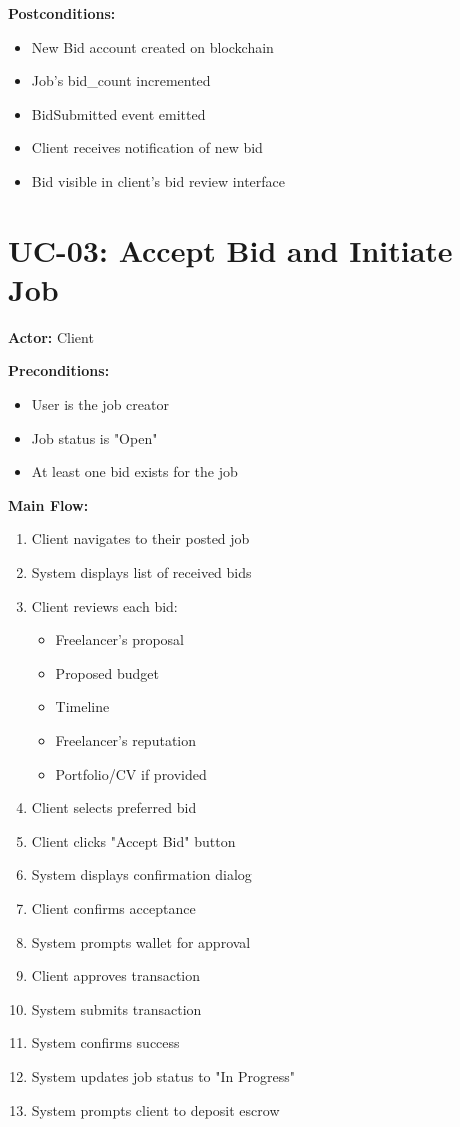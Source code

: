 \documentclass[a4paper,13pt,twoside]{report}
\theoremstyle{definition}
\begin{document}
\textbf{Postconditions:}
\begin{itemize}
    \item New Bid account created on blockchain
    \item Job's bid\_count incremented
    \item BidSubmitted event emitted
    \item Client receives notification of new bid
    \item Bid visible in client's bid review interface
\end{itemize}

\section{UC-03: Accept Bid and Initiate Job}

\textbf{Actor:} Client

\textbf{Preconditions:}
\begin{itemize}
    \item User is the job creator
    \item Job status is "Open"
    \item At least one bid exists for the job
\end{itemize}

\textbf{Main Flow:}
\begin{enumerate}
    \item Client navigates to their posted job
    \item System displays list of received bids
    \item Client reviews each bid:
    \begin{itemize}
        \item Freelancer's proposal
        \item Proposed budget
        \item Timeline
        \item Freelancer's reputation
        \item Portfolio/CV if provided
    \end{itemize}
    \item Client selects preferred bid
    \item Client clicks "Accept Bid" button
    \item System displays confirmation dialog
    \item Client confirms acceptance
    \item System prompts wallet for approval
    \item Client approves transaction
    \item System submits transaction
    \item System confirms success
    \item System updates job status to "In Progress"
    \item System prompts client to deposit escrow
\end{enumerate}
\end{document}
